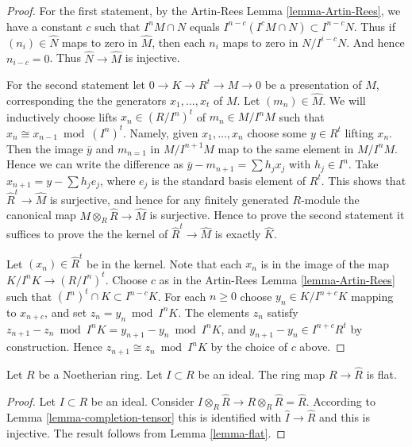 \begin{proof}
For the first statement, by the Artin-Rees Lemma \ref{lemma-Artin-Rees},
we have a constant $c$ such that $I^nM \cap N$
equals $I^{n-c}(I^cM \cap N) \subset I^{n-c}N$.
Thus if $(n_i) \in \hat N$ maps to zero in
$\hat M$, then each $n_i$ maps to zero in $N/I^{i-c}N$.
And hence $n_{i-c} = 0$. Thus $\hat N \to \hat M$ is injective.

\medskip\noindent
For the second statement let $0\to K \to R^t \to M \to 0$
be a presentation of $M$, corresponding the the generators
$x_1, \ldots, x_t$ of $M$. Let $(m_n) \in \hat M$.
We will inductively choose lifts $x_n \in (R/I^n)^t$ of
$m_n \in M/I^nM$ such that $x_n \cong x_{n-1} \bmod (I^n)^t$.
Namely, given $x_1, \ldots, x_n$ choose some $y \in R^t$
lifting $x_n$. Then the image $\overline{y}$ and $m_{n = 1}$
in $M/I^{n + 1}M$ map to the same element in $M/I^nM$.
Hence we can write the difference as
$\overline{y} - m_{n + 1} = \sum h_j x_j$ with
$h_j \in I^n$. Take $x_{n + 1} = y - \sum h_j e_j$, where
$e_j$ is the standard basis element of $R^t$.
This shows that $\hat R^t \to \hat M$ is surjective,
and hence for any finitely generated $R$-module the
canonical map $M \otimes_R \hat R \to \hat M$ is surjective.
Hence to prove the second statement it suffices
to prove the the kernel of $\hat R^t \to \hat M$ is
exactly $\hat K$.

\medskip\noindent
Let $(x_n) \in \hat R^t$ be in the kernel. Note that
each $x_n$ is in the image of the map $K/I^nK \to (R/I^n)^t$.
Choose $c$ as in the Artin-Rees
Lemma \ref{lemma-Artin-Rees} such that $(I^n)^t \cap K
\subset I^{n-c} K$. For each $n \geq 0$ choose
$y_n \in K/I^{n + c}K$ mapping to $x_{n + c}$, and set $z_n = y_n \bmod I^nK$.
The elements $z_n$ satisfy
$z_{n + 1} - z_n \bmod I^nK = y_{n + 1} - y_{n} \bmod I^nK$,
and $y_{n + 1} - y_n \in I^{n + c}R^t$ by construction. Hence
$z_{n + 1} \cong z_n \bmod I^nK$ by the choice of $c$ above.
\end{proof}

\begin{lemma}
\label{lemma-completion-flat}
Let $R$ be a Noetherian ring.
Let $I \subset R$ be an ideal.
The ring map $R \to \hat R$ is flat.
\end{lemma}

\begin{proof}
Let $I \subset R$ be an ideal.
Consider $I \otimes_R \hat R \to R\otimes_R \hat R = \hat R$.
According to Lemma \ref{lemma-completion-tensor} this
is identified with $\hat I \to \hat R$ and this is injective.
The result follows from Lemma \ref{lemma-flat}.
\end{proof}

